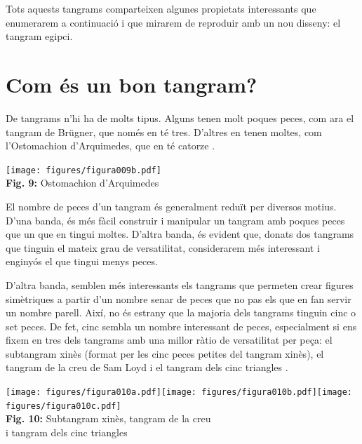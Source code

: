 \documentclass[a4paper,11pt]{article}
\begin{document}
\begin{multicols}{2}
            Tots aquests tangrams comparteixen algunes propietats interessants que enumerarem a continuació i que mirarem de reproduir amb un nou disseny: el tangram egipci.


        \section{Com és un bon tangram?}

            De tangrams n'hi ha de molts tipus. Alguns tenen molt poques peces, com ara el tangram de Brügner, que només en té tres. D'altres en tenen moltes, com l'Ostomachion d'Arquimedes, que en té catorze \cite{netz2009archimedes}.

            \begin{center}
                \texttt{[image: figures/figura009b.pdf]} \\
                \footnotesize{\textbf{Fig. 9:} Ostomachion d'Arquimedes}
            \end{center}

            El nombre de peces d'un tangram és generalment reduït per diversos motius. D'una banda, és més fàcil construir i manipular un tangram amb poques peces que un que en tingui moltes. D'altra banda, és evident que, donats dos tangrams que tinguin el mateix grau de versatilitat, considerarem més interessant i enginyós el que tingui menys peces.

            D'altra banda, semblen més interessants els tangrams que permeten crear figures simètriques a partir d'un nombre senar de peces que no pas els que en fan servir un nombre parell. Així, no és estrany que la majoria dels tangrams tinguin cinc o set peces. De fet, cinc sembla un nombre interessant de peces, especialment si ens fixem en tres dels tangrams amb una millor ràtio de versatilitat per peça: el subtangram xinès (format per les cinc peces petites del tangram xinès), el tangram de la creu de Sam Loyd \cite{coffin2006geometric} i el tangram dels cinc triangles \cite{brinnitzer2017juego, mmaca2018puzles}.

            \begin{center}
                \texttt{[image: figures/figura010a.pdf]}\quad\texttt{[image: figures/figura010b.pdf]}\quad\texttt{[image: figures/figura010c.pdf]} \\
                \footnotesize{\textbf{Fig. 10:} Subtangram xinès, tangram de la creu\\ i tangram dels cinc triangles}
            \end{center}


\end{multicols}
\end{document}
